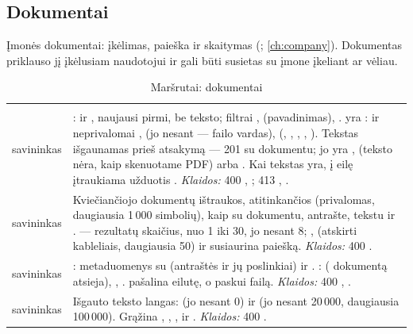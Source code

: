 \subsection{Dokumentai}\label{sec:api:documents}

Įmonės dokumentai: įkėlimas, paieška ir skaitymas (;
\cref{ch:company}). Dokumentas priklauso jį įkėlusiam naudotojui ir gali būti susietas su įmone
įkeliant ar vėliau.

\begin{xltabular}{\textwidth}{@{}L{19mm}Y@{}}
\caption{Maršrutai: dokumentai}\label{tab:api:documents}\\
\toprule {} &  \\ \midrule \endfirsthead
\toprule {} &  \\ \midrule \endhead
\bottomrule \endlastfoot
{}
savininkas & :  ir , naujausi pirmi, be teksto; filtrai
  ,  (pavadinimas), .  yra
  :  ir neprivalomai ,  (jo
  nesant --- failo vardas),  (, , ,
  , ). Tekstas išgaunamas prieš atsakymą --- 201 su dokumentu; jo
   yra ,  (teksto nėra, kaip skenuotame PDF) arba
  . Kai tekstas yra, į eilę įtraukiama užduotis .
  \emph{Klaidos:} 400 , ; 413 ,
  . \\
\addlinespace
{}
savininkas & Kviečiančiojo dokumentų ištraukos, atitinkančios  (privalomas, daugiausia
  1\,000 simbolių), kaip  su dokumentu, antrašte, tekstu ir . 
  --- rezultatų skaičius, nuo 1 iki 30, jo nesant 8; , 
  (atskirti kableliais, daugiausia 50) ir  susiaurina paiešką. \emph{Klaidos:} 400
  . \\
\addlinespace
{}
savininkas & : metaduomenys su  (antraštės ir jų poslinkiai) ir
  . :  ( dokumentą atsieja),
  , .  pašalina eilutę, o paskui failą. \emph{Klaidos:} 400
  , . \\
\addlinespace
{}
savininkas & Išgauto teksto langas:  (jo nesant 0) ir  (jo nesant
  20\,000, daugiausia 100\,000). Grąžina , , , 
  ir . \emph{Klaidos:} 400 . \\
\end{xltabular}

